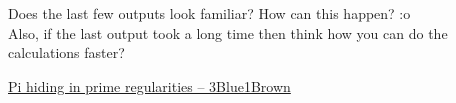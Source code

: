 \documentclass[../../Problems]{subfiles}
\begin{document}
\begin{noteI}
Does the last few outputs look familiar? How can this happen? :o\\
Also, if the last output took a long time then think how you can do the calculations faster?
\end{noteI}
\begin{funvideo}
\href{https://youtu.be/NaL_Cb42WyY}{Pi hiding in prime regularities -- 3Blue1Brown}
\end{funvideo}
\end{document}
